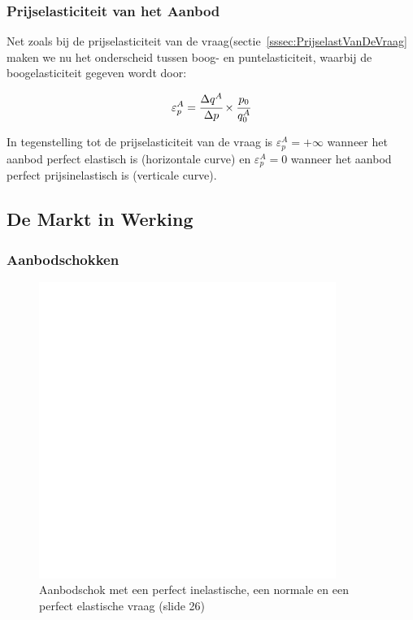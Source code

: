 \subsubsection{Prijselasticiteit van het Aanbod}
Net zoals bij de prijselasticiteit van de vraag(sectie~\ref{sssec:PrijselastVanDeVraag} maken we nu het onderscheid tussen boog- en puntelasticiteit, waarbij de boogelasticiteit gegeven wordt door:

\begin{equation}
	\varepsilon^{A}_{p} =
    \cfrac{\Delta q^A}{\Delta p} \times \cfrac{p_0}{q_{0}^{A}}
\end{equation}

In tegenstelling tot de prijselasticiteit van de vraag is $\varepsilon^{A}_{p} = +\infty$ wanneer het aanbod perfect elastisch is (horizontale curve) en $\varepsilon^{A}_{p} = 0$ wanneer het aanbod perfect prijsinelastisch is (verticale curve).


\subsection{De Markt in Werking}
\subsubsection{Aanbodschokken}
\begin{figure}[htbp]
	\centering
	\includegraphics[scale=0.4]{Images/white.png}
	\caption{Aanbodschok met een perfect inelastische, een normale en een perfect elastische vraag (slide 26)}
	\label{fig:aanbodschok}
\end{figure}


